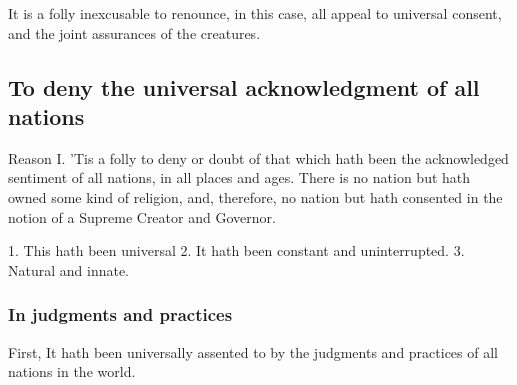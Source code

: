 \documentclass[a5paper]{book}
\begin{document}
It is a folly inexcusable to renounce, in this case, 
    all appeal to universal consent, 
    and the joint assurances of the creatures.

\subsection{To deny the universal acknowledgment of all nations}
Reason I. ’Tis a folly to deny or doubt of that which hath been
    the acknowledged sentiment of all nations, 
    in all places and ages.
There is no nation but hath owned some kind of religion, 
    and, therefore, no nation but hath consented in the notion of 
    a Supreme Creator and Governor.

1. This hath been universal 
2. It hath been constant and uninterrupted. 
3. Natural and innate.

\subsubsection{In judgments and practices}
First, It hath been universally assented to by 
    the judgments and practices of all nations in the world.
\end{document}
